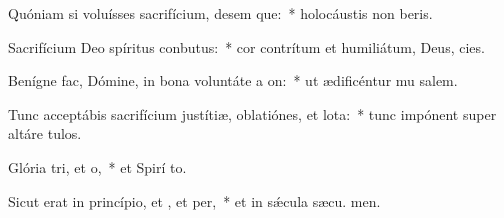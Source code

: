 \item Quóniam si voluísses sacrifícium, desem que:~* holocáustis non beris.
\item Sacrifícium Deo spíritus conbutus:~* cor contrítum et humiliátum, Deus,  cies.
\item Benígne fac, Dómine, in bona voluntáte a on:~* ut ædificéntur mu salem.
\item Tunc acceptábis sacrifícium justítiæ, oblatiónes, et lota:~* tunc impónent super altáre  tulos.
\item Glória tri, et o,~* et Spirí to.
\item Sicut erat in princípio, et , et per,~* et in sǽcula sæcu. men.

